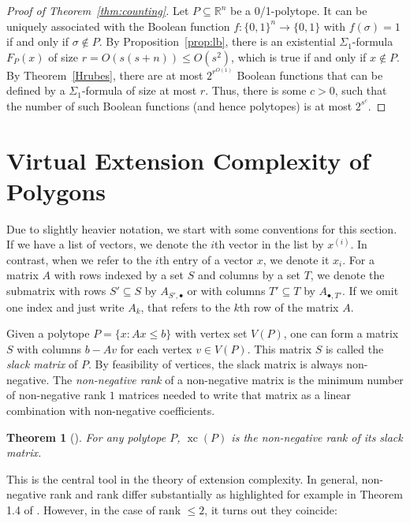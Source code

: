\documentclass[centering,11pt,reqno]{amsart}
\newtheorem{theorem}{Theorem}[section]
\theoremstyle{definition}
\newcommand{\R}{\mathbb{R}}
\DeclareMathOperator{\xc}{xc}
\def\R{\mathbb{R}}
\newcommand{\defn}[1]{\emph{#1}}
\begin{document}
\begin{proof}[Proof of Theorem~\ref{thm:counting}]
    Let $P\subseteq\R^n$ be a 0/1-polytope. 
    It can be uniquely associated with the Boolean function $f:\{0,1\}^n\to\{0,1\}$ with $f(\sigma)=1$ if and only if $\sigma\notin P$.
    By Proposition~\ref{prop:lb}, there is an existential $\Sigma_1$-formula $F_P(x)$ of size $r=O(s(s+n))\le O(s^2)$, which is true if and only if $x\notin P$.
    By Theorem~\ref{Hrubes}, there are at most $2^{r^{O(1)}}$ Boolean functions that can be defined by a $\Sigma_1$-formula of size at most $r$.
    Thus, there is some $c>0$, such that the number of such Boolean functions (and hence polytopes) is at most $2^{s^c}$.
\end{proof}


\section{Virtual Extension Complexity of Polygons}
\label{sec:polygons}




Due to slightly heavier notation, we start with some conventions for this section. 
If we have a list of vectors, we denote the $i$th vector in the list by $x^{(i)}$. 
In contrast, when we refer to the $i$th entry of a vector $x$, we denote it $x_{i}$. 
For a matrix $A$ with rows indexed by a set $S$ and columns by a set $T$, we denote the submatrix with rows $S' \subseteq S$ by $A_{S', \bullet}$ or with columns $T' \subseteq T$ by $A_{\bullet, T'}$. If we omit one index and just write $A_{k}$, that refers to the $k$th row of the matrix $A$.

Given a polytope $P = \{x: A x \leq b\}$ with vertex set $V(P)$, one can form a matrix $S$ with columns $b - Av$ for each vertex $v \in V(P)$. This matrix $S$ is called the \defn{slack matrix} of $P$. By feasibility of vertices, the slack matrix is always non-negative. The \defn{non-negative rank} of a non-negative matrix is the minimum number of non-negative rank $1$ matrices needed to write that matrix as a linear combination with non-negative coefficients. 

\begin{theorem}[\cite{YannakakisLemma}]
For any polytope $P$, $\xc(P)$ is the non-negative rank of its slack matrix.
\end{theorem}

This is the central tool in the theory of extension complexity. In general, non-negative rank and rank differ substantially as highlighted for example in Theorem 1.4 of \cite{LowDimExtensions}. However, in the case of rank $\leq 2$, it turns out they coincide:
\end{document}
